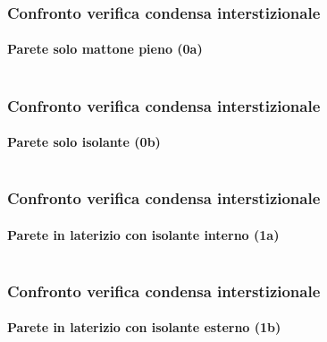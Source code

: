 \documentclass[aspectratio=141,10pt]{beamer}
\begin{document}
\begin{frame}
    \frametitle{Confronto verifica condensa interstizionale}
    \framesubtitle{Parete solo mattone pieno (0a)}
    \begin{columns}
        \begin{column}{0.45\textwidth}
            \resizebox{\textwidth}{!}{%
            
            }
        \end{column}
        \pause
        \begin{column}{0.55\textwidth}
            \scriptsize
            
        \end{column}
    \end{columns}
\end{frame}
\begin{frame}
    \frametitle{Confronto verifica condensa interstizionale}
    \framesubtitle{Parete solo isolante (0b)}
    \begin{columns}
        \begin{column}{0.45\textwidth}
            \resizebox{\textwidth}{!}{%
            
            }
        \end{column}
        \begin{column}{0.55\textwidth}
            \scriptsize
            
        \end{column}
    \end{columns}
\end{frame}
\begin{frame}
    \frametitle{Confronto verifica condensa interstizionale}
    \framesubtitle{Parete in laterizio con isolante interno (1a)}
    \begin{columns}
        \begin{column}{0.45\textwidth}
            \resizebox{\textwidth}{!}{%
            
            }
        \end{column}
        \begin{column}{0.55\textwidth}
            \scriptsize
            
        \end{column}
    \end{columns}
\end{frame}
\begin{frame}
    \frametitle{Confronto verifica condensa interstizionale}
    \framesubtitle{Parete in laterizio con isolante esterno (1b)}
    \begin{columns}
        \begin{column}{0.45\textwidth}
            \resizebox{\textwidth}{!}{%
            
            }
        \end{column}
        \begin{column}{0.55\textwidth}
            \scriptsize
            
        \end{column}
    \end{columns}
\end{frame}
\end{document}
